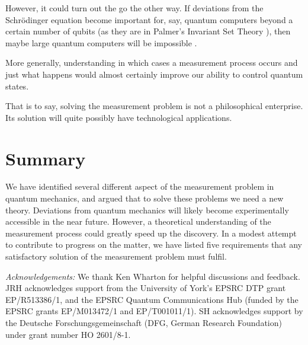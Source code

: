 \documentclass[superscriptaddress,floatfix,nofootinbib,12pt]{revtex4-2}
\begin{document}
However, it could turn out the go the other way. If deviations from the Schr\"odinger equation become important for, say, quantum computers beyond a certain number of qubits (as they are in Palmer's Invariant Set Theory \cite{Palmer2020Discretization}), then maybe large quantum computers will be impossible \cite{slagle2021testing,Hance2021ExpIST}.  

More generally, understanding in which cases a measurement process occurs and just what happens would almost certainly improve our ability to control quantum states.

That is to say, solving the measurement problem is not a philosophical enterprise. Its solution will quite possibly have technological applications. 

\section{Summary}

We have identified several different aspect of the measurement problem in quantum mechanics, and argued that to solve these problems we need a new theory. Deviations from quantum mechanics will likely become experimentally accessible in the near future. However, a theoretical understanding of the measurement process could greatly speed up the discovery. In a modest attempt to contribute to progress on the matter, we have listed five requirements that any satisfactory solution of the measurement problem must fulfil. 

\bigskip

\textit{Acknowledgements:} We thank Ken Wharton for helpful discussions and feedback.
JRH acknowledges support from the University of York's EPSRC DTP grant EP/R513386/1, and the EPSRC Quantum Communications Hub (funded by the EPSRC grants EP/M013472/1 and EP/T001011/1). SH acknowledges support by the Deutsche Forschungsgemeinschaft (DFG, German Research Foundation) under grant number HO 2601/8-1.  







\end{document}
